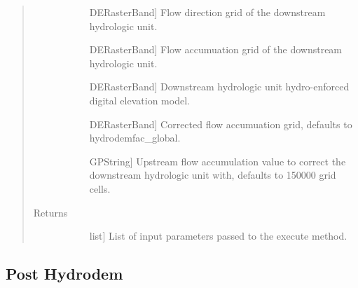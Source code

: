 \documentclass[letterpaper,10pt,english]{sphinxmanual}
\begin{document}
\begin{fulllineitems}
\begin{fulllineitems}
\begin{quote}
\begin{description}
\begin{description}
\item[{}] \leavevmode{[}DERasterBand{]}
Flow direction grid of the downstream hydrologic unit.

\item[{}] \leavevmode{[}DERasterBand{]}
Flow accumuation grid of the downstream hydrologic unit.

\item[{}] \leavevmode{[}DERasterBand{]}
Downstream hydrologic unit hydro-enforced digital elevation model.

\item[{}] \leavevmode{[}DERasterBand{]}
Corrected flow accumuation grid, defaults to hydrodemfac\_global.

\item[{}] \leavevmode{[}GPString{]}
Upstream flow accumulation value to correct the downstream hydrologic unit with, defaults to 150000 grid cells.

\end{description}

\item[{Returns}] \leavevmode\begin{description}
\item[{}] \leavevmode{[}list{]}
List of input parameters passed to the execute method.

\end{description}

\end{description}\end{quote}

\end{fulllineitems}


\end{fulllineitems}



\subsection{Post Hydrodem}
\label{\detokenize{StreamStats_DataPrep:post-hydrodem}}
\end{document}
